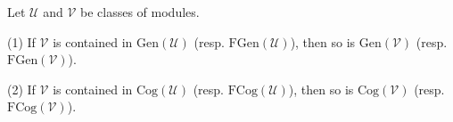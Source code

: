 Let $\mathcal{U}$ and $\mathcal{V}$ be classes of modules.

(1) If $\mathcal{V}$ is contained in $\mathrm{Gen}(\mathcal{U})$ (resp. $\mathrm{FGen}(\mathcal{U})$), then so is $\mathrm{Gen}(\mathcal{V})$ (resp. $\mathrm{FGen}(\mathcal{V})$).

(2) If $\mathcal{V}$ is contained in $\mathrm{Cog}(\mathcal{U})$ (resp. $\mathrm{FCog}(\mathcal{U})$), then so is $\mathrm{Cog}(\mathcal{V})$ (resp. $\mathrm{FCog}(\mathcal{V})$).
